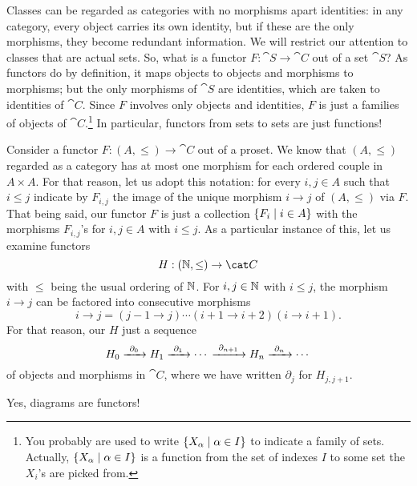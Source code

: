 \begin{example}\label{example:CollectionsAreCats}
Classes can be regarded as categories with no morphisms apart identities: in any category, every object carries its own identity, but if these are the only morphisms, they become redundant information. We will restrict our attention to classes that are actual sets.\newline
So, what is a functor \(F : \cat S \to \cat C\) out of a set \(\cat S\)? As functors do by definition, it maps objects to objects and morphisms to morphisms; but the only morphisms of \(\cat S\) are identities, which are taken to identities of \(\cat C\). Since \(F\) involves only objects and identities, \(F\) is just a families of objects of \(\cat C\).\footnote{You probably are used to write \(\left\{X_\alpha \mid \alpha \in I\right\}\) to indicate a family of sets. Actually, \(\left\{X_\alpha \mid \alpha \in I\right\}\) is a function from the set of indexes \(I\) to some set the \(X_i\)'s are picked from.} In particular, functors from sets to sets are just functions!
\end{example}

\begin{example}
Consider a functor \(F : (A, \le) \to \cat C\) out of a proset. We know that \((A, \le)\) regarded as a category has at most one morphism for each ordered couple in \(A \times A\). For that reason, let us adopt this notation: for every \(i, j \in A\) such that \(i \le j\) indicate by \(F_{i,j}\) the image of the unique morphism \(i \to j\) of \((A, \le)\) via \(F\). That being said, our functor \(F\) is just a collection \(\left\{F_i \mid i \in A\right\}\) with the morphisms \(F_{i,j}\)'s for \(i, j \in A\) with \(i \le j\).\newline
As a particular instance of this, let us examine functors
\[H : (\naturals, \le) \to \cat C\]
with \(\le\) being the usual ordering of \(\mathbb N\). For \(i, j \in \mathbb N\) with \(i \le j\), the morphism \(i \to j\) can be factored into consecutive morphisms
\[i \to j = (j-1 \to j) \cdots{} (i+1 \to i+2) (i \to i+1) .\]
For that reason, our \(H\)  just a sequence
\[H_0 \xrightarrow{\ \partial_0\ } H_1 \xrightarrow{\ \partial_1\ } \cdots{} \xrightarrow{\ \partial_{n+1}\ } H_n \xrightarrow{\ \partial_n\ } \cdots{}\]
of objects and morphisms in \(\cat C\), where we have written \(\partial_j\) for \(H_{j, j+1}\).
\end{example}

\begin{exercise}
Yes, diagrams are functors!
\end{exercise}

